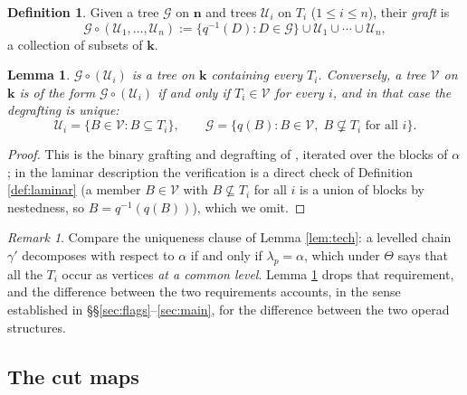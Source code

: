 \documentclass[12pt]{amsart}
\newtheorem{lemma}[subsection]{Lemma}
\theoremstyle{definition}
\newtheorem{definition}[subsection]{Definition}
\theoremstyle{remark}
\newtheorem{remark}[subsection]{Remark}
\newcommand{\Cal}[1]{\mathcal{#1}}
\newcommand{\Thet}{\Theta}                       %
\begin{document}
\begin{definition}\label{def:graft}
Given a tree $\Cal{G}$ on $\mathbf{n}$ and trees $\Cal{U}_i$ on $T_i$ ($1\leq i\leq n$), their \emph{graft} is
\[ \Cal{G}\circ(\Cal{U}_1,\dots,\Cal{U}_n) := \{ q^{-1}(D) : D\in \Cal{G}\} \cup \Cal{U}_1\cup \cdots \cup \Cal{U}_n,\]
a collection of subsets of $\mathbf{k}$.
\end{definition}

\begin{lemma}\label{lem:graft-degraft}
$\Cal{G}\circ(\Cal{U}_i)$ is a tree on $\mathbf{k}$ containing every $T_i$. Conversely, a tree $\Cal{V}$ on $\mathbf{k}$ is of the form $\Cal{G}\circ (\Cal{U}_i)$ if and only if $T_i\in \Cal{V}$ for every $i$, and in that case the \emph{degrafting} is unique:
\[ \Cal{U}_i = \{B\in\Cal{V} : B\subseteq T_i\}, \quad\quad \Cal{G} = \{ q(B) : B\in \Cal{V},\; B\not\subsetneq T_i \text{ for all } i \}.\]
\end{lemma}

\begin{proof}
This is the binary grafting and degrafting of \cite[Definition 4.14, Lemma 4.15]{Ching-thesis}, iterated over the blocks of $\alpha$; in the laminar description the verification is a direct check of Definition \ref{def:laminar} (a member $B\in\Cal{V}$ with $B\not\subseteq T_i$ for all $i$ is a union of blocks by nestedness, so $B = q^{-1}(q(B))$), which we omit.
\end{proof}

\begin{remark}\label{rem:graft-vs-ching}
Compare the uniqueness clause of Lemma \ref{lem:tech}: a levelled chain $\gamma'$ decomposes with respect to $\alpha$ if and only if $\lambda_p = \alpha$, which under $\Thet$ says that all the $T_i$ occur as vertices \emph{at a common level}. Lemma \ref{lem:graft-degraft} drops that requirement, and the difference between the two requirements accounts, in the sense established in \S\S\ref{sec:flags}--\ref{sec:main}, for the difference between the two operad structures.
\end{remark}

\subsection{The cut maps}\label{sec:cutmaps}
\end{document}
